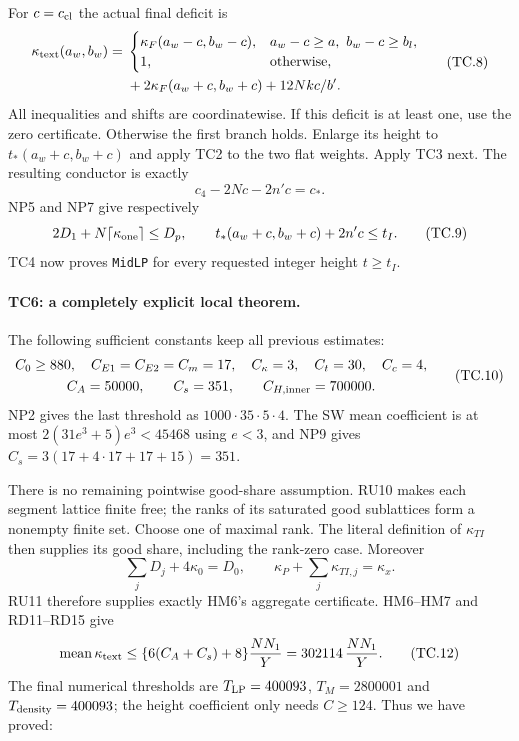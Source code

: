 \documentclass[11pt,a4paper]{article}
\numberwithin{equation}{section}
\theoremstyle{remark}\newtheorem{remark}[theorem]{Remark}
\begin{document}
For $c=c_{\rm cl}$ the actual final deficit is
\[
 \begin{split}
 \kappa_{\rm text}(a_w,b_w)
  ={}&\begin{cases}
      \kappa_F(a_w-c,b_w-c),&
          a_w-c\ge a,\ b_w-c\ge b_l,\\
      1,&\text{otherwise},
      \end{cases}\\
     &+2\kappa_F(a_w+c,b_w+c)+12Nkc/b'.
 \end{split}                                           \tag{TC.8}
\]
All inequalities and shifts are coordinatewise. If this deficit
is at least one, use the zero certificate. Otherwise the first
branch holds. Enlarge its height to $t_*(a_w+c,b_w+c)$ and
apply TC2 to the two flat weights. Apply TC3 next. The resulting
conductor is exactly
\[
 c_4-2Nc-2n'c=c_*.
\]
NP5 and NP7 give respectively
\[
 2D_1+N\lceil\kappa_{\rm one}\rceil\le D_p,\qquad
 t_*(a_w+c,b_w+c)+2n'c\le t_I.                         \tag{TC.9}
\]
TC4 now proves \texttt{MidLP} for every requested integer
height $t\ge t_I$.

\paragraph{TC6: a completely explicit local theorem.}
The following sufficient constants keep all previous estimates:
\[
 \begin{gathered}
 C_0\ge880,\quad C_{E1}=C_{E2}=C_m=17,\quad
 C_\kappa=3,\quad C_t=30,\quad C_c=4,\\
 C_A=50000,\qquad C_s=351,\qquad C_{H,\rm inner}=700000.
 \end{gathered}                                         \tag{TC.10}
\]
NP2 gives the last threshold as $1000\cdot35\cdot5\cdot4$.
The SW mean coefficient is at most
$2(31e^3+5)e^3<45468$ using $e<3$, and NP9 gives
$C_s=3(17+4\cdot17+17+15)=351$.

There is no remaining pointwise good-share assumption.
RU10 makes each segment lattice finite free; the ranks of its
saturated good sublattices form a nonempty finite set. Choose
one of maximal rank. The literal definition of $\kappa_{TI}$
then supplies its good share, including the rank-zero case.
Moreover
\[
 \sum_jD_j+4\kappa_0=D_0,\qquad
 \kappa_P+\sum_j\kappa_{TI,j}=\kappa_x.                 \tag{TC.11}
\]
RU11 therefore supplies exactly HM6's aggregate certificate.
HM6--HM7 and RD11--RD15 give
\[
 \operatorname{mean}\kappa_{\rm text}
     \le \{6(C_A+C_s)+8\}\frac{NN_1}{Y}
     =302114\,\frac{NN_1}{Y}.                          \tag{TC.12}
\]
The final numerical thresholds are
$T_{\rm LP}=400093$, $T_M=2800001$ and
$T_{\rm density}=400093$; the height coefficient only needs
$C\ge124$. Thus we have proved:
\end{document}
